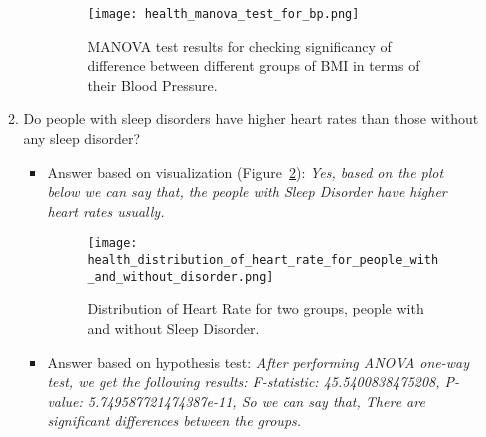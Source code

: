 \documentclass{article}
\begin{document}
\begin{enumerate}
\begin{enumerate}[label=(\alph*)]
\begin{itemize}
            \begin{figure}[H]  %

                \centering
                \texttt{[image: health\_manova\_test\_for\_bp.png]}  %
                \caption{MANOVA test results for checking significancy of difference between different groups of BMI in terms of their Blood Pressure.}
                \label{fig:Figure_6}  %
    
            \end{figure}

        \end{itemize}

        \item Do people with sleep disorders have higher heart rates than those without
        any sleep disorder?
        \begin{itemize}
            \item Answer based on visualization (Figure~\ref{fig:Figure_7}):
            \textit{Yes, based on the plot below we can say that, the people with Sleep Disorder have higher heart rates usually.}
            
            \begin{figure}[H]  %

                \centering
                \texttt{[image: health\_distribution\_of\_heart\_rate\_for\_people\_with\_and\_without\_disorder.png]}  %
                \caption{Distribution of Heart Rate for two groups, people with and without Sleep Disorder.}
                \label{fig:Figure_7}  %
    
            \end{figure}

            \item Answer based on hypothesis test:
            \textit{After performing ANOVA one-way test, we get the following results: F-statistic: 45.5400838475208, P-value: 5.749587721474387e-11, So we can say that, There are significant differences between the groups.}
        \end{itemize}

    \end{enumerate}    

\end{enumerate}
\end{document}
